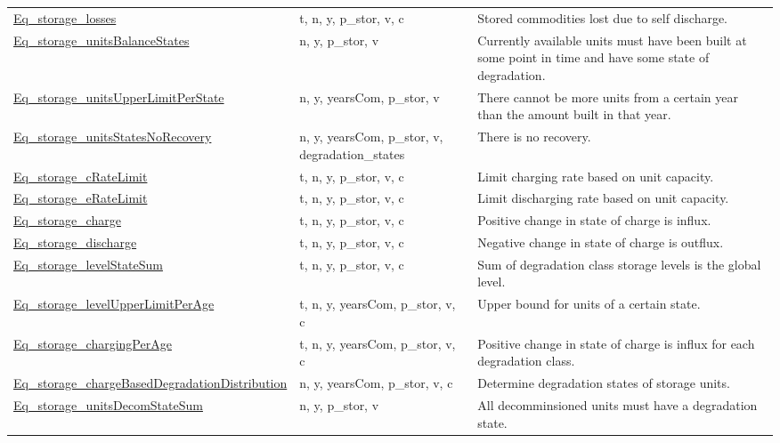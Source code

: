 \documentclass[11pt]{article}
\begin{document}
\begin{tabularx}{\textwidth}{| l | l | X |}
\hyperref[Eq_storage_losses]{Eq\_storage\_losses}  & t, n, y, p\_stor, v, c & Stored commodities lost due to self discharge. \\ 
\hyperref[Eq_storage_unitsBalanceStates]{Eq\_storage\_unitsBalanceStates}  & n, y, p\_stor, v & Currently available units must have been built at some point in time and have some state of degradation. \\ 
\hyperref[Eq_storage_unitsUpperLimitPerState]{Eq\_storage\_unitsUpperLimitPerState}  & n, y, yearsCom, p\_stor, v & There cannot be more units from a certain year than the amount built in that year. \\ 
\hyperref[Eq_storage_unitsStatesNoRecovery]{Eq\_storage\_unitsStatesNoRecovery}  & n, y, yearsCom, p\_stor, v, degradation\_states & There is no recovery. \\ 
\hyperref[Eq_storage_cRateLimit]{Eq\_storage\_cRateLimit}  & t, n, y, p\_stor, v, c & Limit charging rate based on unit capacity. \\ 
\hyperref[Eq_storage_eRateLimit]{Eq\_storage\_eRateLimit}  & t, n, y, p\_stor, v, c & Limit discharging rate based on unit capacity. \\ 
\hyperref[Eq_storage_charge]{Eq\_storage\_charge}  & t, n, y, p\_stor, v, c & Positive change in state of charge is influx. \\ 
\hyperref[Eq_storage_discharge]{Eq\_storage\_discharge}  & t, n, y, p\_stor, v, c & Negative change in state of charge is outflux. \\ 
\hyperref[Eq_storage_levelStateSum]{Eq\_storage\_levelStateSum}  & t, n, y, p\_stor, v, c & Sum of degradation class storage levels is the global level. \\ 
\hyperref[Eq_storage_levelUpperLimitPerAge]{Eq\_storage\_levelUpperLimitPerAge}  & t, n, y, yearsCom, p\_stor, v, c & Upper bound for units of a certain state. \\ 
\hyperref[Eq_storage_chargingPerAge]{Eq\_storage\_chargingPerAge}  & t, n, y, yearsCom, p\_stor, v, c & Positive change in state of charge is influx for each degradation class. \\ 
\hyperref[Eq_storage_chargeBasedDegradationDistribution]{Eq\_storage\_chargeBasedDegradationDistribution}  & n, y, yearsCom, p\_stor, v, c & Determine degradation states of storage units. \\ 
\hyperref[Eq_storage_unitsDecomStateSum]{Eq\_storage\_unitsDecomStateSum}  & n, y, p\_stor, v & All decomminsioned units must have a degradation state. \\ 

\end{tabularx}
\end{document}
